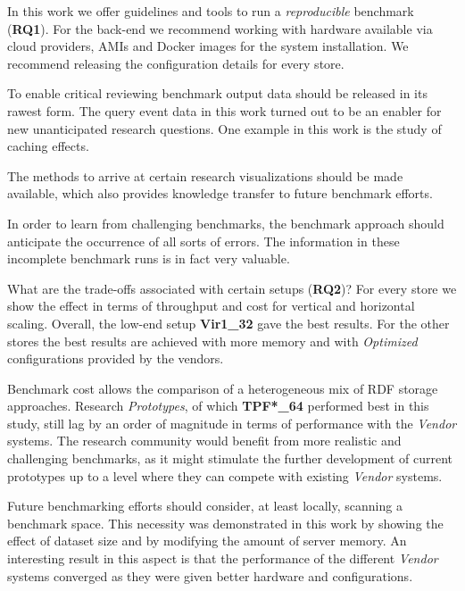 
In this work we offer guidelines and tools to run a \emph{reproducible} benchmark (\textbf{RQ1}). For the back-end we recommend working with hardware available via cloud providers, AMIs and Docker images for the system installation. We recommend releasing the configuration details for every store. 

To enable critical reviewing benchmark output data should be released in its rawest form. The  query event data in this work turned out to be an enabler for new unanticipated research questions. One example in this work is the study of caching effects. 

The methods to arrive at certain research visualizations should be made available, which also provides knowledge transfer to future benchmark efforts. 

In order to learn from challenging benchmarks, the benchmark approach should anticipate the occurrence of all sorts of errors. The information in these incomplete benchmark runs is in fact very valuable. 

What are the trade-offs associated with certain setups (\textbf{RQ2})? For every store we show the effect in terms of throughput and cost for vertical and horizontal scaling. 
Overall, the low-end setup \textbf{Vir1\_32} gave the best results. For the other stores the best results are achieved with more memory and with \emph{Optimized} configurations provided by the vendors.

Benchmark cost allows the comparison of a heterogeneous mix of RDF storage approaches. Research \emph{Prototypes}, of which \textbf{TPF*\_64} performed best in this study, still lag by an order of magnitude in terms of performance with the \emph{Vendor} systems. The research community would benefit from more realistic and challenging benchmarks, as it might stimulate the further development of current prototypes up to a level where they can compete with existing \emph{Vendor} systems.

Future benchmarking efforts should consider, at least locally, scanning a benchmark space. This necessity was demonstrated in this work by showing the effect of dataset size and by modifying the amount of server memory. An interesting result in this aspect is that the performance of the different \emph{Vendor} systems converged as they were given better hardware and configurations.

